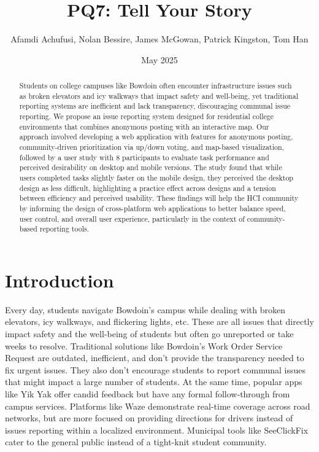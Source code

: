 \documentclass{article}
\title{PQ7: Tell Your Story}
\author{Afamdi Achufusi, Nolan Bessire, James McGowan, Patrick Kingston, Tom Han}
\date{May 2025}
\begin{document}
\maketitle

\begin{abstract}
    Students on college campuses like Bowdoin often encounter infrastructure issues such as broken elevators and icy walkways that impact safety and well-being, yet traditional reporting systems are inefficient and lack transparency, discouraging communal issue reporting. We propose an issue reporting system designed for residential college environments that combines anonymous posting with an interactive map. Our approach involved developing a web application with features for anonymous posting, community-driven prioritization via up/down voting, and map-based visualization, followed by a user study with 8 participants to evaluate task performance and perceived desirability on desktop and mobile versions. The study found that while users completed tasks slightly faster on the mobile design, they perceived the desktop design as less difficult, highlighting a practice effect across designs and a tension between efficiency and perceived usability. These findings will help the HCI community by informing the design of cross-platform web applications to better balance speed, user control, and overall user experience, particularly in the context of community-based reporting tools.
\end{abstract}

\newpage

\tableofcontents

\newpage

\section{Introduction}

Every day, students navigate Bowdoin’s campus while dealing with broken elevators, icy walkways, and flickering lights, etc. These are all issues that directly impact safety and the well‐being of students but often go unreported or take weeks to resolve. Traditional solutions like Bowdoin’s Work Order Service Request are outdated, inefficient, and don’t provide the transparency needed to fix urgent issues. They also don’t encourage students to report communal issues that might impact a large number of students. At the same time, popular apps like Yik Yak offer candid feedback but have any formal follow‐through from campus services. Platforms like Waze demonstrate real-time coverage across road networks, but are more focused on providing directions for drivers instead of issues reporting within a localized environment. Municipal tools like SeeClickFix cater to the general public instead of a tight-knit student community. 
\end{document}
